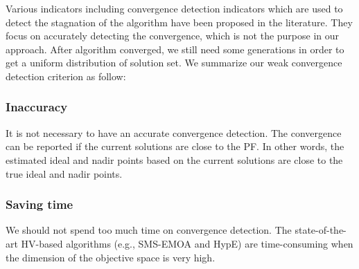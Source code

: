\documentclass[conference]{IEEEtran}
\begin{document}
%
%
%
Various indicators including convergence detection indicators which are used to detect the stagnation of the algorithm 
have been proposed in the literature\cite{convergenceDetection:1, convergenceDetection:LSSC, 
convergenceDetection:OCD, convergenceDetection:OFCDandOCD, convergenceDetection:convergenceMetric, 
convergenceDetection:maxCD, convergenceDetection:online}. 
They focus on accurately detecting the convergence, which is not the purpose in our approach.
After algorithm converged, we still need some generations in order to
get a uniform distribution of solution set. 
We summarize our weak convergence detection criterion as follow:
\subsubsection{Inaccuracy} It is not necessary to have an accurate convergence detection. 
The convergence can be reported if the current solutions are close to the PF.
In other words, the estimated ideal and nadir points based on the current solutions
are close to the true ideal and nadir points. 
\subsubsection{Saving time} We should not spend too much time on convergence detection. 
The state-of-the-art HV-based algorithms (e.g., SMS-EMOA and HypE) 
are time-consuming when the dimension of the objective space is very high. 
\end{document}
